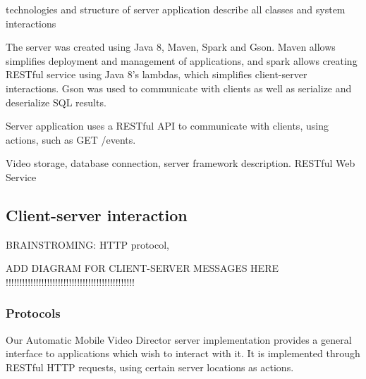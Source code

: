 \documentclass[conference]{IEEEtran}
\begin{document}
technologies and structure of server application
describe all classes and system interactions

The server was created using Java 8, Maven, Spark and Gson. Maven allows simplifies deployment and management of applications,
and spark allows creating RESTful service using Java 8's lambdas, which simplifies client-server interactions.
Gson was used to communicate with clients as well as serialize and deserialize SQL results.

Server application uses a RESTful API to communicate with clients, using actions, such as GET /events.

Video storage, database connection, server framework description. RESTful Web Service


\subsection{Client-server interaction}
BRAINSTROMING: HTTP protocol, 

    ADD DIAGRAM FOR CLIENT-SERVER MESSAGES HERE !!!!!!!!!!!!!!!!!!!!!!!!!!!!!!!!!!!!!!!!!!!!!!!

\subsubsection{Protocols}
Our Automatic Mobile Video Director server implementation provides 
a general interface to applications which wish to interact with it. 
It is implemented through RESTful HTTP requests, using certain server locations as actions.
\end{document}
